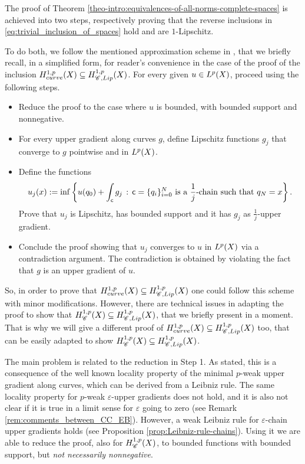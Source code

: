 \documentclass[12pt]{amsart}
\newcommand{\X}{{\rm X}}
\newcommand{\Lip}{{\rm Lip}}
\theoremstyle{definition}
\newcommand{\sfc}{{\sf c}}
\newcommand{\Chain}[1]{\mathscr{C}^{#1}}
\newcommand{\HH}[2]{H^{1,#1}_{{\rm #2}}}
\begin{document}
The proof of Theorem \ref{theo-intro:equivalences-of-all-norms-complete-spaces} is achieved into two steps, respectively proving that the reverse inclusions in \eqref{eq:trivial_inclusion_of_spaces} hold and are $1$-Lipschitz.

To do both, we follow the mentioned approximation scheme in \cite{Eriksson-Bique-Density-in-energy}, that we briefly recall, in a simplified form, for reader's convenience in the case of the proof of the inclusion $\HH{p}{curve}(\X) \subseteq \HH{p}{\Chain{},\Lip}(\X)$. For every given $u\in L^p(\X)$, proceed using the following steps.
\begin{itemize}
    \item[(Step 1)] Reduce the proof to the case where $u$ is bounded, with bounded support and nonnegative.
    \item[(Step 2)] For every upper gradient along curves $g$, define Lipschitz functions $g_j$ that converge to $g$ pointwise and in $L^p(\X)$.
    \item[(Step 3)] Define the functions 
    $$u_j(x) := \inf\left\{ u(q_0) + \int_\sfc g_j \,:\, \sfc = \{q_i\}_{i=0}^N \text{ is a }\frac{1}{j}\text{-chain such that } q_N = x\right\}.$$
    Prove that $u_j$ is Lipschitz, has bounded support and it has $g_j$ as $\frac{1}{j}$-upper gradient.
    \item[(Step 4)] Conclude the proof showing that $u_j$ converges to $u$ in $L^p(\X)$ via a contradiction argument. The contradiction is obtained by violating the fact that $g$ is an upper gradient of $u$.
\end{itemize}


So, in order to prove that $\HH{p}{curve}(\X) \subseteq \HH{p}{\Chain{},\Lip}(\X)$ one could follow this scheme with minor modifications. However, there are technical issues in adapting the proof to show that $\HH{p}{\Chain{}}(\X) \subseteq \HH{p}{\Chain{},\Lip}(\X)$, that we briefly present in a moment. That is why we will give a different proof of $\HH{p}{curve}(\X) \subseteq \HH{p}{\Chain{},\Lip}(\X)$ too, that can be easily adapted to show $\HH{p}{\Chain{}}(\X) \subseteq \HH{p}{\Chain{},\Lip}(\X)$.

The main problem is related to the reduction in Step 1.
As stated, this is a consequence of the well known locality property of the minimal $p$-weak upper gradient along curves, which can be derived from a Leibniz rule. The same locality property for $p$-weak $\varepsilon$-upper gradients does not hold, and it is also not clear if it is true in a limit sense for $\varepsilon$ going to zero (see Remark \ref{rem:comments_between_CC_EB}). However, a weak Leibniz rule for $\varepsilon$-chain upper gradients holds (see Proposition \ref{prop:Leibniz-rule-chains}). Using it we are able to reduce the proof, also for $\HH{p}{\Chain{}}(\X)$, to bounded functions with bounded support, but \emph{not necessarily nonnegative}.
\end{document}
